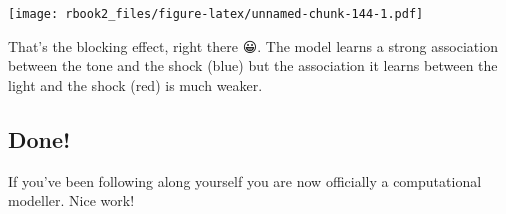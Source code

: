 \documentclass[]{book}
\begin{document}
\texttt{[image: rbook2\_files/figure-latex/unnamed-chunk-144-1.pdf]}

That's the blocking effect, right there 😀. The model learns a strong association between the tone and the shock (blue) but the association it learns between the light and the shock (red) is much weaker.

\hypertarget{done}{%
\subsection{Done!}\label{done}}

If you've been following along yourself you are now officially a computational modeller. Nice work!


\end{document}
